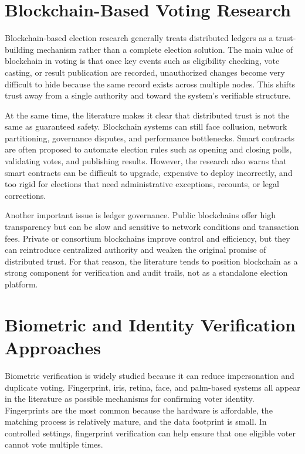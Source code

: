 \section{Blockchain-Based Voting Research}
Blockchain-based election research generally treats distributed ledgers as a trust-building mechanism rather than a complete election solution. The main value of blockchain in voting is that once key events such as eligibility checking, vote casting, or result publication are recorded, unauthorized changes become very difficult to hide because the same record exists across multiple nodes. This shifts trust away from a single authority and toward the system’s verifiable structure.

At the same time, the literature makes it clear that distributed trust is not the same as guaranteed safety. Blockchain systems can still face collusion, network partitioning, governance disputes, and performance bottlenecks. Smart contracts are often proposed to automate election rules such as opening and closing polls, validating votes, and publishing results. However, the research also warns that smart contracts can be difficult to upgrade, expensive to deploy incorrectly, and too rigid for elections that need administrative exceptions, recounts, or legal corrections.

Another important issue is ledger governance. Public blockchains offer high transparency but can be slow and sensitive to network conditions and transaction fees. Private or consortium blockchains improve control and efficiency, but they can reintroduce centralized authority and weaken the original promise of distributed trust. For that reason, the literature tends to position blockchain as a strong component for verification and audit trails, not as a standalone election platform.

\section{Biometric and Identity Verification Approaches}
Biometric verification is widely studied because it can reduce impersonation and duplicate voting. Fingerprint, iris, retina, face, and palm-based systems all appear in the literature as possible mechanisms for confirming voter identity. Fingerprints are the most common because the hardware is affordable, the matching process is relatively mature, and the data footprint is small. In controlled settings, fingerprint verification can help ensure that one eligible voter cannot vote multiple times.

